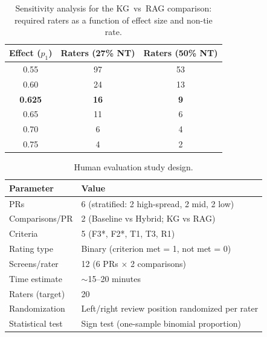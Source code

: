 
\begin{table}[t]
\centering
\caption{Sensitivity analysis for the KG~vs~RAG comparison: required raters as a function of effect size and non-tie rate.}
\label{tab:sensitivity}
\begin{tabular}{ccc}
\toprule
\textbf{Effect ($p_1$)} & \textbf{Raters (27\% NT)} & \textbf{Raters (50\% NT)} \\
\midrule
0.55  & 97 & 53 \\
0.60  & 24 & 13 \\
\textbf{0.625} & \textbf{16} & \textbf{9} \\
0.65  & 11 & 6 \\
0.70  & 6  & 4 \\
0.75  & 4  & 2 \\
\bottomrule
\end{tabular}
\end{table}



\begin{table}[t]
\centering
\caption{Human evaluation study design.}
\label{tab:study-design}
\begin{tabular}{ll}
\toprule
\textbf{Parameter} & \textbf{Value} \\
\midrule
PRs              & 6 (stratified: 2 high-spread, 2 mid, 2 low) \\
Comparisons/PR   & 2 (Baseline vs Hybrid; KG vs RAG) \\
Criteria         & 5 (F3*, F2*, T1, T3, R1) \\
Rating type      & Binary (criterion met = 1, not met = 0) \\
Screens/rater    & 12 (6 PRs $\times$ 2 comparisons) \\
Time estimate    & $\sim$15--20 minutes \\
Raters (target)  & 20 \\
Randomization    & Left/right review position randomized per rater \\
Statistical test & Sign test (one-sample binomial proportion) \\
\bottomrule
\end{tabular}
\end{table}
